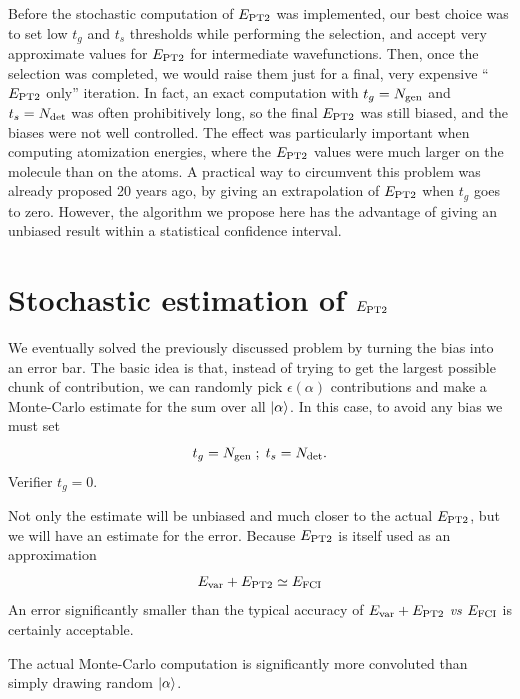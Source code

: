 \documentclass[./thesis.tex]{subfiles}
\begin{document}
Before the stochastic computation of $E_\text{PT2}$ was implemented, our best choice was to set low $t_g$ and $t_s$ thresholds while performing the selection, and accept very approximate values for $E_\text{PT2}$ for intermediate wavefunctions. Then, once the selection was completed, we would raise them just for a final, very expensive ``$E_\text{PT2}$ only'' iteration. In fact, an exact computation with $t_g={N_\text{gen}}$ and $t_s={N_\text{det}}$ was often prohibitively long, so the final $E_\text{PT2}$ was still biased, and the biases were not well controlled. The effect was particularly important when computing atomization energies, where the $E_\text{PT2}$ values were much larger on the molecule than on the atoms.
A practical way to circumvent this problem was already proposed 20 years ago, by giving an extrapolation of $E_\text{PT2}$ when $t_g$ goes to zero.\cite{Angeli_1997} However, the algorithm we propose here has the advantage of giving an unbiased result within a statistical confidence interval.

\section{Stochastic estimation of $E_\text{PT2}$}

We eventually solved the previously discussed problem by turning the bias into an error bar. The basic idea is that, instead of trying to get the largest possible chunk of contribution, we can randomly pick $\epsilon(\alpha)$ contributions and make a Monte-Carlo estimate for the sum over all $\ket \alpha$. In this case, to avoid any bias we must set
\begin{equation}
t_g = {N_\text{gen}} \; ; \; t_s = {N_\text{det}}.
\end{equation}
\alert{Verifier $t_g = 0$}.

Not only the estimate will be unbiased and much closer to the actual $E_\text{PT2}$, but we will have an estimate for the error. Because $E_\text{PT2}$ is itself used as an approximation
\begin{equation}
E_\text{var} + E_\text{PT2} \simeq E_\text{FCI}
\end{equation}
An error significantly smaller than the typical accuracy of $E_\text{var} + E_\text{PT2}$ \textit{vs} $E_\text{FCI}$ is certainly acceptable.


The actual Monte-Carlo computation is significantly more convoluted than simply drawing random ${\ket{\alpha}}$.
\end{document}
